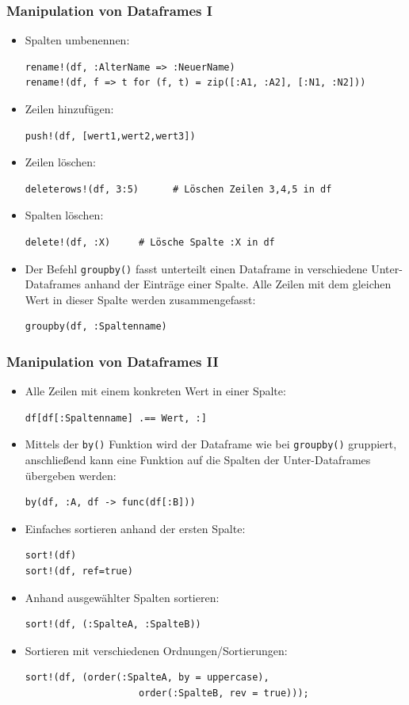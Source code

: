 \begin{frame}[fragile]
\frametitle{Manipulation von Dataframes I}
\begin{itemize}[<+->]
\item Spalten umbenennen: 
\begin{verbatim}
rename!(df, :AlterName => :NeuerName)
rename!(df, f => t for (f, t) = zip([:A1, :A2], [:N1, :N2]))
\end{verbatim}
\item Zeilen hinzufügen:
\begin{verbatim}
push!(df, [wert1,wert2,wert3]) 
\end{verbatim}
\item Zeilen löschen:
\begin{verbatim}
deleterows!(df, 3:5)      # Löschen Zeilen 3,4,5 in df
\end{verbatim}
\item Spalten löschen:
\begin{verbatim}
delete!(df, :X)     # Lösche Spalte :X in df
\end{verbatim}
\item Der Befehl \verb+groupby()+ fasst unterteilt einen Dataframe in verschiedene Unter-Dataframes anhand der Einträge einer Spalte. Alle Zeilen mit dem gleichen Wert in dieser Spalte werden zusammengefasst:
\begin{verbatim}
groupby(df, :Spaltenname)
\end{verbatim}
\end{itemize}
\end{frame}
\begin{frame}[fragile]
\frametitle{Manipulation von Dataframes II}
\begin{itemize}[<+->]
\item Alle Zeilen mit einem konkreten Wert in einer Spalte:
\begin{verbatim}
df[df[:Spaltenname] .== Wert, :]
\end{verbatim}
\item Mittels der \verb+by()+ Funktion wird der Dataframe wie bei \verb+groupby()+ gruppiert, anschließend kann eine Funktion auf die Spalten der Unter-Dataframes übergeben werden:
\begin{verbatim}
by(df, :A, df -> func(df[:B]))
\end{verbatim}
\item Einfaches sortieren anhand der ersten Spalte:
\begin{verbatim}
sort!(df)
sort!(df, ref=true)
\end{verbatim}
\item Anhand ausgewählter Spalten sortieren:
\begin{verbatim}
sort!(df, (:SpalteA, :SpalteB))
\end{verbatim}
\item Sortieren mit verschiedenen Ordnungen/Sortierungen:
\begin{verbatim}
sort!(df, (order(:SpalteA, by = uppercase),
                    order(:SpalteB, rev = true)));
\end{verbatim}
\end{itemize}
\end{frame}
